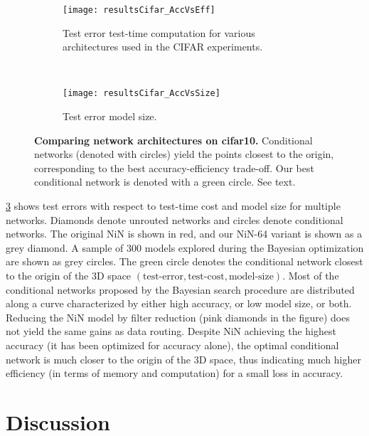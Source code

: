\documentclass[thesis]{subfiles}
\begin{document}
	
	\begin{figure}[tbp] 
		\centering
		\begin{subfigure}[b]{0.9\linewidth}
			\centering
			\texttt{[image: resultsCifar\_AccVsEff]}
			\caption{Test error \vs test-time computation for various architectures used in the CIFAR experiments.}\label{fig:resultsCifar_AccVsEff}
		\end{subfigure}
		~
		\begin{subfigure}[b]{0.9\linewidth}
			\centering
			\texttt{[image: resultsCifar\_AccVsSize]}
			\caption{Test error \vs model size.}\label{fig:resultsCifar_AccVsSize}
		\end{subfigure}
		\caption[Comparing network architectures on \gls{cifar10}]{\textbf{Comparing network architectures on \gls{cifar10}.} Conditional networks (denoted with circles) yield the points closest to the origin, corresponding to the best accuracy-efficiency trade-off. Our best conditional network is denoted with a green circle. See text.}\label{fig:Cifar_results}
	\end{figure}
	\cref{fig:Cifar_results} shows test errors with respect to test-time cost and model size for multiple networks.
	Diamonds denote unrouted networks and circles denote conditional networks. 
	The original NiN is shown in red, and our NiN-64 variant is shown as a grey diamond.
	A sample of 300 models explored during the Bayesian optimization are shown as grey circles.
	The green circle denotes the conditional network closest to the origin of the 
	3D space $(\textrm{test-error}, \textrm{test-cost}, \textrm{model-size})$.
	Most of the conditional networks proposed by the Bayesian search procedure are distributed along a curve characterized by either high accuracy, or low model size, or both. 
	Reducing the NiN model by filter reduction (pink diamonds in the figure) does not yield the same gains as data routing.
	Despite NiN achieving the highest accuracy (it has been optimized for accuracy alone), the optimal conditional network is much closer to the origin of the 3D space, thus indicating much higher efficiency (in terms of memory and computation) for a small loss in accuracy.
	
	\section{Discussion}

\end{document}
